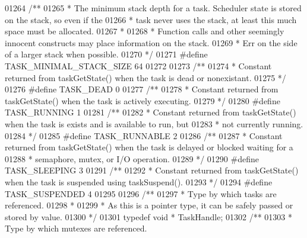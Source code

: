 \begin{DoxyCode}
{{{{{{{{{01264 \textcolor{comment}{/**}
01265 \textcolor{comment}{ * The minimum stack depth for a task. Scheduler state is stored on the stack, so even if the}
01266 \textcolor{comment}{ * task never uses the stack, at least this much space must be allocated.}
01267 \textcolor{comment}{ *}
01268 \textcolor{comment}{ * Function calls and other seemingly innocent constructs may place information on the stack.}
01269 \textcolor{comment}{ * Err on the side of a larger stack when possible.}
01270 \textcolor{comment}{ */}
01271 \textcolor{preprocessor}{#}\textcolor{preprocessor}{define} \textcolor{preprocessor}{TASK\_MINIMAL\_STACK\_SIZE}    64
01272 
01273 \textcolor{comment}{/**}
01274 \textcolor{comment}{ * Constant returned from taskGetState() when the task is dead or nonexistant.}
01275 \textcolor{comment}{ */}
01276 \textcolor{preprocessor}{#}\textcolor{preprocessor}{define} \textcolor{preprocessor}{TASK\_DEAD} 0
01277 \textcolor{comment}{/**}
01278 \textcolor{comment}{ * Constant returned from taskGetState() when the task is actively executing.}
01279 \textcolor{comment}{ */}
01280 \textcolor{preprocessor}{#}\textcolor{preprocessor}{define} \textcolor{preprocessor}{TASK\_RUNNING} 1
01281 \textcolor{comment}{/**}
01282 \textcolor{comment}{ * Constant returned from taskGetState() when the task is exists and is available to run, but}
01283 \textcolor{comment}{ * not currently running.}
01284 \textcolor{comment}{ */}
01285 \textcolor{preprocessor}{#}\textcolor{preprocessor}{define} \textcolor{preprocessor}{TASK\_RUNNABLE} 2
01286 \textcolor{comment}{/**}
01287 \textcolor{comment}{ * Constant returned from taskGetState() when the task is delayed or blocked waiting for a}
01288 \textcolor{comment}{ * semaphore, mutex, or I/O operation.}
01289 \textcolor{comment}{ */}
01290 \textcolor{preprocessor}{#}\textcolor{preprocessor}{define} \textcolor{preprocessor}{TASK\_SLEEPING} 3
01291 \textcolor{comment}{/**}
01292 \textcolor{comment}{ * Constant returned from taskGetState() when the task is suspended using taskSuspend().}
01293 \textcolor{comment}{ */}
01294 \textcolor{preprocessor}{#}\textcolor{preprocessor}{define} \textcolor{preprocessor}{TASK\_SUSPENDED} 4
01295 
01296 \textcolor{comment}{/**}
01297 \textcolor{comment}{ * Type by which tasks are referenced.}
01298 \textcolor{comment}{ *}
01299 \textcolor{comment}{ * As this is a pointer type, it can be safely passed or stored by value.}
01300 \textcolor{comment}{ */}
01301 \textcolor{keyword}{typedef} \textcolor{keywordtype}{void} * TaskHandle;
01302 \textcolor{comment}{/**}
01303 \textcolor{comment}{ * Type by which mutexes are referenced.}
}}}}}}}}}
\end{DoxyCode}
